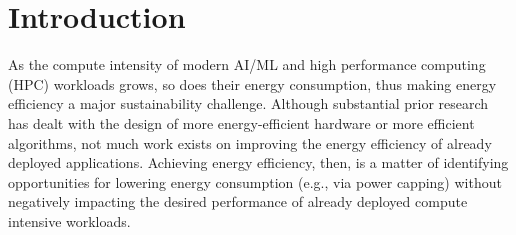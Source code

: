 \section{Introduction}\label{ch4:sec:Introduction}

As the compute intensity of modern AI/ML and high performance computing (HPC) workloads grows, 
so does their energy consumption, thus making energy efficiency a major sustainability challenge. 
%
Although substantial prior research has dealt with the design of more energy-efficient hardware 
or  more efficient algorithms, not much work exists on improving the energy efficiency of 
already deployed applications. Achieving energy efficiency, then, is a matter of identifying 
opportunities for lowering energy consumption (e.g., via power capping) without negatively impacting 
the desired performance of already deployed compute intensive workloads.




